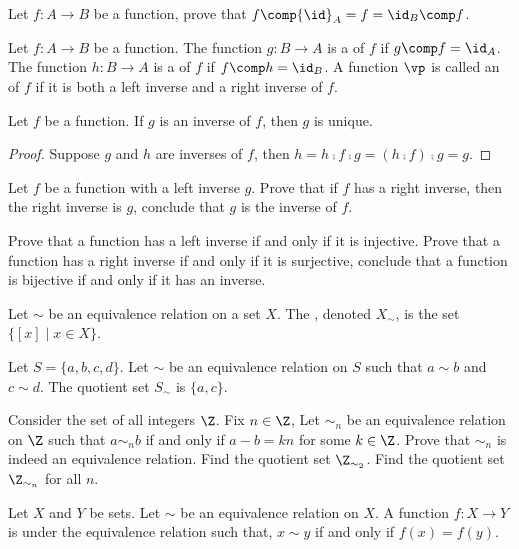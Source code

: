 \documentclass[10pt]{article}
\begin{document}
\begin{problem}
    Let $f:A\to B$ be a function, prove that $f\comp{\id}_{A}=f={\id}_{B}\comp f$.
\end{problem}
\begin{definition}
    Let $f:A\to B$ be a function. The function $g:B\to A$ is a  of $f$ if $g\comp f={\id}_{A}$. The function $h:B\to A$ is a  of $f$ if $f\comp h={\id}_{B}$. A function $\vp$ is called an  of $f$ if it is both a left inverse and a right inverse of $f$.
\end{definition}
\begin{proposition}
    Let $f$ be a function. If $g$ is an inverse of $f$, then $g$ is unique.
\end{proposition}
\begin{proof}
    Suppose $g$ and $h$ are inverses of $f$, then $h=h\comp f\comp g=(h\comp f)\comp g=g$.
\end{proof}
\begin{problem}
    Let $f$ be a function with a left inverse $g$. Prove that if $f$ has a right inverse, then the right inverse is $g$, conclude that $g$ is the inverse of $f$.
\end{problem}
\begin{problem}
    Prove that a function has a left inverse if and only if it is injective. Prove that a function has a right inverse if and only if it is surjective, conclude that a function is bijective if and only if it has an inverse.
\end{problem}
\begin{definition}
    Let $\sim$ be an equivalence relation on a set $X$. The , denoted ${X}_{\sim}$, is the set $\{[x]\mid x\in X\}$.
\end{definition}
\begin{example}
    Let $S=\{a,b,c,d\}$. Let $\sim$ be an equivalence relation on $S$ such that $a\sim b$ and $c\sim d$. The quotient set ${S}_{\sim}$ is $\{a,c\}$.
\end{example}
\begin{problem}
    Consider the set of all integers $\Z$. Fix $n\in\Z$, Let ${\sim}_{n}$ be an equivalence relation on $\Z$ such that $a{\sim}_{n}b$ if and only if $a-b=kn$ for some $k\in\Z$. Prove that ${\sim}_{n}$ is indeed an equivalence relation. Find the quotient set ${\Z}_{{\sim}_{2}}$. Find the quotient set ${\Z}_{{\sim}_{n}}$ for all $n$. 
\end{problem}
\begin{definition}
    Let $X$ and $Y$ be sets. Let $\sim$ be an equivalence relation on $X$. A function $f:X\to Y$ is  under the equivalence relation such that, $x\sim y$ if and only if $f(x)=f(y)$.
\end{definition}
\end{document}
